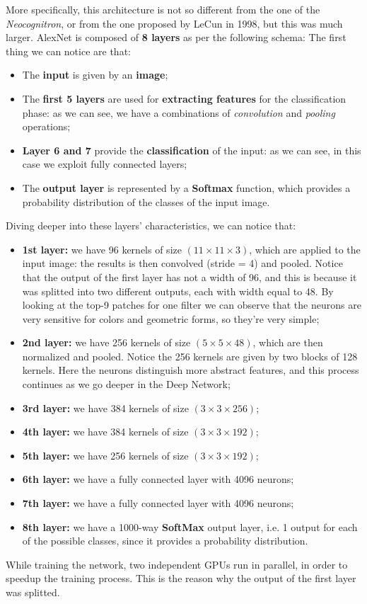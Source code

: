 More specifically, this architecture is not so different from the one of the \textit{Neocognitron}, or from the one proposed by LeCun in 1998, but this was much larger. AlexNet is composed of \textbf{8 layers} as per the following schema:
The first thing we can notice are that:

\begin{itemize}
    \item The \textbf{input} is given by an \textbf{image};
    \item The \textbf{first 5 layers} are used for \textbf{extracting features} for the classification phase: as we can see, we have a combinations of \textit{convolution} and \textit{pooling} operations;
    \item \textbf{Layer 6 and 7} provide the \textbf{classification} of the input: as we can see, in this case we exploit fully connected layers;
    \item The \textbf{output layer} is represented by a \textbf{Softmax} function, which provides a probability distribution of the classes of the input image.
\end{itemize}


Diving deeper into these layers' characteristics, we can notice that:
\begin{itemize}
	\item \textbf{1st layer:} we have 96 kernels of size $(11 \times 11 \times 3)$, which are applied to the input image: the results is then convolved (stride = 4) and pooled. Notice that the output of the first layer has not a width of 96, and this is because it was splitted into two different outputs, each with width equal to 48. By looking at the top-9 patches for one filter we can observe that the neurons are very sensitive for colors and geometric forms, so they're very simple;
	\item \textbf{2nd layer:} we have 256 kernels of size $(5 \times 5 \times 48)$, which are then normalized and pooled. Notice the 256 kernels are given by two blocks of 128 kernels. Here the neurons distinguish more abstract features, and this process continues as we go deeper in the Deep Network;
	\item \textbf{3rd layer:} we have 384 kernels of size $(3 \times 3 \times 256)$;
	\item \textbf{4th layer:} we have 384 kernels of size $(3 \times 3 \times 192)$;
	\item \textbf{5th layer:} we have 256 kernels of size $(3 \times 3 \times 192)$;
	\item \textbf{6th layer:} we have a fully connected layer with 4096 neurons;
	\item \textbf{7th layer:} we have a fully connected layer with 4096 neurons;
	\item \textbf{8th layer:} we have a 1000-way \textbf{SoftMax} output layer, i.e. 1 output for each of the possible classes, since it provides a probability distribution.
\end{itemize}
While training the network, two independent GPUs run in parallel, in order to speedup the training process. This is the reason why the output of the first layer was splitted. 

